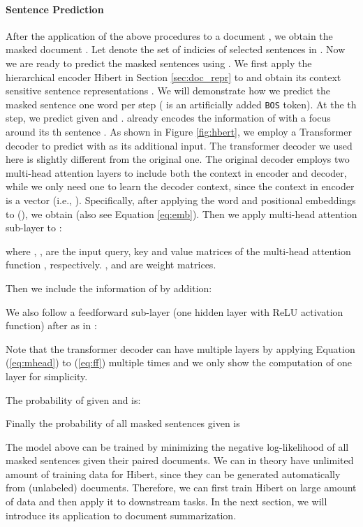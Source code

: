 \documentclass[11pt,a4paper]{article}
\begin{document}
\paragraph{Sentence Prediction} After the application of the above procedures to a document , we obtain the masked document . Let  denote the set of indicies of selected sentences in . Now we are ready to predict the masked sentences  using . 
We first apply the hierarchical encoder {\sc Hibert} in Section \ref{sec:doc_repr} to  and obtain its context sensitive sentence representations . We will demonstrate how we predict the masked sentence  one word per step ( is an artificially added {\tt BOS} token). At the th step, we predict  given  and .  already encodes the information of  with a focus around its th sentence . As shown in Figure \ref{fig:hbert}, we employ a Transformer decoder \cite{vaswani:2017:nips} to predict  with  as its additional input. The transformer decoder we used here is slightly different from the original one. The original decoder employs two multi-head attention layers to include both the context in encoder and decoder, while we only need one to learn the decoder context, since the context in encoder is a vector (i.e., ). Specifically, after applying the word and positional embeddings to (), we obtain  (also see Equation \ref{eq:emb}). Then we apply multi-head attention sub-layer to :

where , ,  are the input query, key and value matrices of the multi-head attention function \cite{vaswani:2017:nips} , respectively. ,  and  are weight matrices. 

Then we include the information of  by addition:

We also follow a feedforward sub-layer (one hidden layer with ReLU \cite{glorot:2011:aistats} activation function) after  as in :

Note that the transformer decoder can have multiple layers by applying Equation (\ref{eq:mhead}) to (\ref{eq:ff}) multiple times and we only show the computation of one layer for simplicity.


The probability of  given  and  is:

Finally the probability of all masked sentences  given  is 

The model above can be trained by minimizing the negative log-likelihood of all masked sentences given their paired documents. We can in theory have unlimited amount of training data for \mbox{{\sc Hibert}}, since they can be generated automatically from (unlabeled) documents. Therefore, we can first train {\sc Hibert} on large amount of data and then apply it to downstream tasks. In the next section, we will introduce its application to document summarization. 
\end{document}

